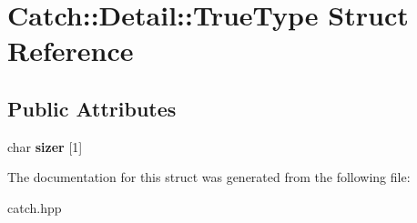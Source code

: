 \hypertarget{structCatch_1_1Detail_1_1TrueType}{}\section{Catch\+:\+:Detail\+:\+:True\+Type Struct Reference}
\label{structCatch_1_1Detail_1_1TrueType}
\subsection*{Public Attributes}
\begin{DoxyCompactItemize}
\item 
char {\bfseries sizer} \mbox{[}1\mbox{]}\hypertarget{structCatch_1_1Detail_1_1TrueType_a3aaaeb75909e668b293c8a81f5fb6419}{}\label{structCatch_1_1Detail_1_1TrueType_a3aaaeb75909e668b293c8a81f5fb6419}

\end{DoxyCompactItemize}


The documentation for this struct was generated from the following file\+:\begin{DoxyCompactItemize}
\item 
catch.\+hpp\end{DoxyCompactItemize}
